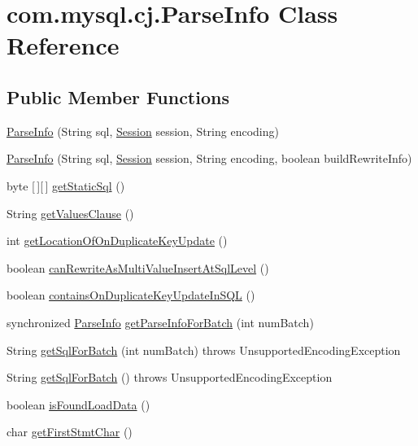 \hypertarget{classcom_1_1mysql_1_1cj_1_1_parse_info}{}\section{com.\+mysql.\+cj.\+Parse\+Info Class Reference}
\label{classcom_1_1mysql_1_1cj_1_1_parse_info}
\subsection*{Public Member Functions}
\begin{DoxyCompactItemize}
\item 
\mbox{\hyperlink{classcom_1_1mysql_1_1cj_1_1_parse_info_a2ad9d4e1a851a9a83dd98fa5680b2582}{Parse\+Info}} (String sql, \mbox{\hyperlink{interfacecom_1_1mysql_1_1cj_1_1_session}{Session}} session, String encoding)
\item 
\mbox{\hyperlink{classcom_1_1mysql_1_1cj_1_1_parse_info_a3d8041c18abed49b875e46d462787547}{Parse\+Info}} (String sql, \mbox{\hyperlink{interfacecom_1_1mysql_1_1cj_1_1_session}{Session}} session, String encoding, boolean build\+Rewrite\+Info)
\item 
byte \mbox{[}$\,$\mbox{]}\mbox{[}$\,$\mbox{]} \mbox{\hyperlink{classcom_1_1mysql_1_1cj_1_1_parse_info_a7bcdc3fc9f3ba6ee10cbebd852ec7499}{get\+Static\+Sql}} ()
\item 
String \mbox{\hyperlink{classcom_1_1mysql_1_1cj_1_1_parse_info_ab4edc6aeb613cae7e4c882b28e760a02}{get\+Values\+Clause}} ()
\item 
int \mbox{\hyperlink{classcom_1_1mysql_1_1cj_1_1_parse_info_a068d6757223b8e1aa1aae78d75201728}{get\+Location\+Of\+On\+Duplicate\+Key\+Update}} ()
\item 
boolean \mbox{\hyperlink{classcom_1_1mysql_1_1cj_1_1_parse_info_ab74791d029e7a456e2b7d34f5dfd491f}{can\+Rewrite\+As\+Multi\+Value\+Insert\+At\+Sql\+Level}} ()
\item 
boolean \mbox{\hyperlink{classcom_1_1mysql_1_1cj_1_1_parse_info_ac5edf580e4fabda26a81d7f2920491ed}{contains\+On\+Duplicate\+Key\+Update\+In\+S\+QL}} ()
\item 
synchronized \mbox{\hyperlink{classcom_1_1mysql_1_1cj_1_1_parse_info}{Parse\+Info}} \mbox{\hyperlink{classcom_1_1mysql_1_1cj_1_1_parse_info_afb6755fef767af487192ea4a4f589d24}{get\+Parse\+Info\+For\+Batch}} (int num\+Batch)
\item 
String \mbox{\hyperlink{classcom_1_1mysql_1_1cj_1_1_parse_info_a7a1053a89e14ce278d2617ee0f56010f}{get\+Sql\+For\+Batch}} (int num\+Batch)  throws Unsupported\+Encoding\+Exception 
\item 
String \mbox{\hyperlink{classcom_1_1mysql_1_1cj_1_1_parse_info_a49a364ef5d8d3f1ac2ea98576601a926}{get\+Sql\+For\+Batch}} ()  throws Unsupported\+Encoding\+Exception 
\item 
boolean \mbox{\hyperlink{classcom_1_1mysql_1_1cj_1_1_parse_info_a65f8d65a575cc6ad9497fbd55b5ee22e}{is\+Found\+Load\+Data}} ()
\item 
char \mbox{\hyperlink{classcom_1_1mysql_1_1cj_1_1_parse_info_a29b231e147f11d1da6d1c5b40a2df776}{get\+First\+Stmt\+Char}} ()
\end{DoxyCompactItemize}

